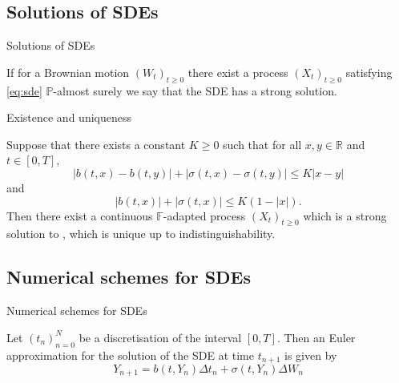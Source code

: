 \documentclass{beamer}
\begin{document}
\subsection{Solutions of SDEs}
\begin{frame}{Solutions of SDEs}
        \begin{definition}
                If for a Brownian motion
                $ (W_{t})_{t \ge 0} $
                there exist a process
                $ (X_{t})_{t \ge 0} $
                satisfying
                \eqref{eq:sde}
                $ \mathbb{P} $-almost surely
                we say that the SDE has a strong solution.
        \end{definition}


\end{frame}

\begin{frame}{Existence and uniqueness}
        \begin{theorem}
                \label{th:sde_soln}
                Suppose that there exists a constant
                $ K \ge 0 $
                such that for all
                $ x, y \in \mathbb{R} $
                and
                $ t \in [0,T] $,
                \begin{equation*}
                        | b(t,x) - b(t,y) | + | \sigma(t,x) - \sigma(t,y) | \le K | x - y|
                \end{equation*}
                and
                \begin{equation*}
                        | b(t,x) | + | \sigma(t,x) | \le K (1 - | x |).
                \end{equation*}
                Then there exist a continuous
                $ \mathbb{F} $-adapted
                process
                $ (X_{t})_{t \ge 0} $
                which is a strong solution to
                \label{eq:sde},
                which is unique up to indistinguishability.
        \end{theorem}
\end{frame}

\subsection{Numerical schemes for SDEs}
\begin{frame}{Numerical schemes for SDEs}
        \begin{definition}
                Let
                $ (t_{n})_{n=0}^{N} $
                be a discretisation of the interval
                $ [0,T] $.
                Then an Euler approximation for the solution of the SDE
                \label{eq:sde}
                at time
                $ t_{n+1} $
                is given by
                \begin{equation*}
                        Y_{n+1} = b(t, Y_{n}) \Delta t_{n} + \sigma(t, Y_{n}) \Delta W_{n}
                \end{equation*}
        \end{definition}
\end{frame}
\end{document}
